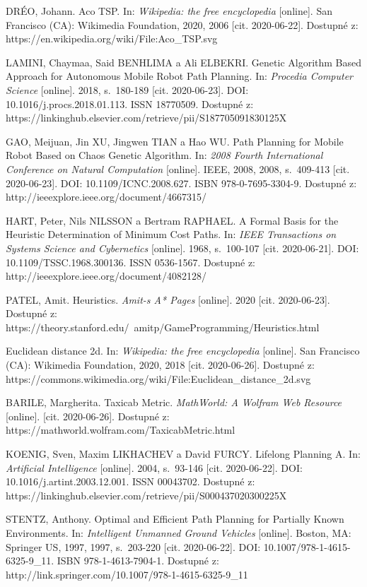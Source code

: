 \begin{thebibliography}{99}
DRÉO, Johann. Aco TSP. In: \textit{Wikipedia: the free encyclopedia} [online]. San Francisco (CA): Wikimedia Foundation, 2020, 2006 [cit. 2020-06-22]. Dostupné z: https://en.wikipedia.org/wiki/File:Aco\_TSP.svg

LAMINI, Chaymaa, Said BENHLIMA a Ali ELBEKRI. Genetic Algorithm Based Approach for Autonomous Mobile Robot Path Planning. In: \textit{Procedia Computer Science} [online]. 2018, s.~180-189 [cit. 2020-06-23]. DOI: 10.1016/j.procs.2018.01.113. ISSN 18770509. Dostupné z: https://linkinghub.elsevier.com/retrieve/pii/S187705091830125X

GAO, Meijuan, Jin XU, Jingwen TIAN a Hao WU. Path Planning for Mobile Robot Based on Chaos Genetic Algorithm. In: \textit{2008 Fourth International Conference on Natural Computation} [online]. IEEE, 2008, 2008, s.~409-413 [cit. 2020-06-23]. DOI: 10.1109/ICNC.2008.627. ISBN 978-0-7695-3304-9. Dostupné z: http://ieeexplore.ieee.org/document/4667315/

HART, Peter, Nils NILSSON a Bertram RAPHAEL. A Formal Basis for the Heuristic Determination of Minimum Cost Paths. In: \textit{IEEE Transactions on Systems Science and Cybernetics} [online]. 1968, s.~100-107 [cit. 2020-06-21]. DOI: 10.1109/TSSC.1968.300136. ISSN 0536-1567. Dostupné z: http://ieeexplore.ieee.org/document/4082128/

PATEL, Amit. Heuristics. \textit{Amit-s A* Pages} [online]. 2020 [cit. 2020-06-23]. Dostupné z: https://theory.stanford.edu/~amitp/GameProgramming/Heuristics.html

Euclidean distance 2d. In: \textit{Wikipedia: the free encyclopedia} [online]. San Francisco (CA): Wikimedia Foundation, 2020, 2018 [cit. 2020-06-26]. Dostupné z: https://commons.wikimedia.org/wiki/File:Euclidean\_distance\_2d.svg

BARILE, Margherita. Taxicab Metric. \textit{MathWorld: A Wolfram Web Resource} [online]. [cit. 2020-06-26]. Dostupné z: https://mathworld.wolfram.com/TaxicabMetric.html

KOENIG, Sven, Maxim LIKHACHEV a David FURCY. Lifelong Planning A. In: \textit{Artificial Intelligence} [online]. 2004, s.~93-146 [cit. 2020-06-22]. DOI: 10.1016/j.artint.2003.12.001. ISSN 00043702. Dostupné z: https://linkinghub.elsevier.com/retrieve/pii/S000437020300225X

STENTZ, Anthony. Optimal and Efficient Path Planning for Partially Known Environments. In: \textit{Intelligent Unmanned Ground Vehicles} [online]. Boston, MA: Springer US, 1997, 1997, s.~203-220 [cit. 2020-06-22]. DOI: 10.1007/978-1-4615-6325-9\_11. ISBN 978-1-4613-7904-1. Dostupné z: http://link.springer.com/10.1007/978-1-4615-6325-9\_11


\end{thebibliography}
